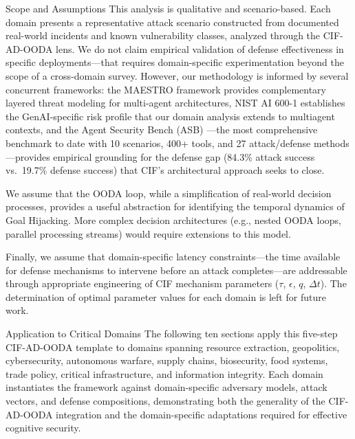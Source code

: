 \documentclass[
  ignorenonframetext,
]{beamer}
\begin{document}
\begin{frame}[allowframebreaks]{Scope and Assumptions}
\protect{}\label{scope-and-assumptions}
This analysis is qualitative and scenario-based. Each domain presents a
representative attack scenario constructed from documented real-world
incidents and known vulnerability classes, analyzed through the
CIF-AD-OODA lens. We do not claim empirical validation of defense
effectiveness in specific deployments---that requires domain-specific
experimentation beyond the scope of a cross-domain survey. However, our
methodology is informed by several concurrent frameworks: the MAESTRO
framework \cite{csa2025maestro} provides complementary layered threat
modeling for multi-agent architectures, NIST AI 600-1
\cite{nist2024genai} establishes the GenAI-specific risk profile that
our domain analysis extends to multiagent contexts, and the Agent
Security Bench (ASB) \cite{zhang2025asb}---the most comprehensive
benchmark to date with 10 scenarios, 400+ tools, and 27 attack/defense
methods---provides empirical grounding for the defense gap (84.3\%
attack success vs.~19.7\% defense success) that CIF's architectural
approach seeks to close.

We assume that the OODA loop, while a simplification of real-world
decision processes, provides a useful abstraction for identifying the
temporal dynamics of Goal Hijacking. More complex decision architectures
(e.g., nested OODA loops, parallel processing streams) would require
extensions to this model.

Finally, we assume that domain-specific latency constraints---the time
available for defense mechanisms to intervene before an attack
completes---are addressable through appropriate engineering of CIF
mechanism parameters (\(\tau\), \(\epsilon\), \(q\), \(\Delta t\)). The
determination of optimal parameter values for each domain is left for
future work.
\end{frame}

\begin{frame}[allowframebreaks]{Application to Critical Domains}
\protect{}\label{application-to-critical-domains}
The following ten sections apply this five-step CIF-AD-OODA template to
domains spanning resource extraction, geopolitics, cybersecurity,
autonomous warfare, supply chains, biosecurity, food systems, trade
policy, critical infrastructure, and information integrity. Each domain
instantiates the framework against domain-specific adversary models,
attack vectors, and defense compositions, demonstrating both the
generality of the CIF-AD-OODA integration and the domain-specific
adaptations required for effective cognitive security.
\end{frame}
\end{document}
